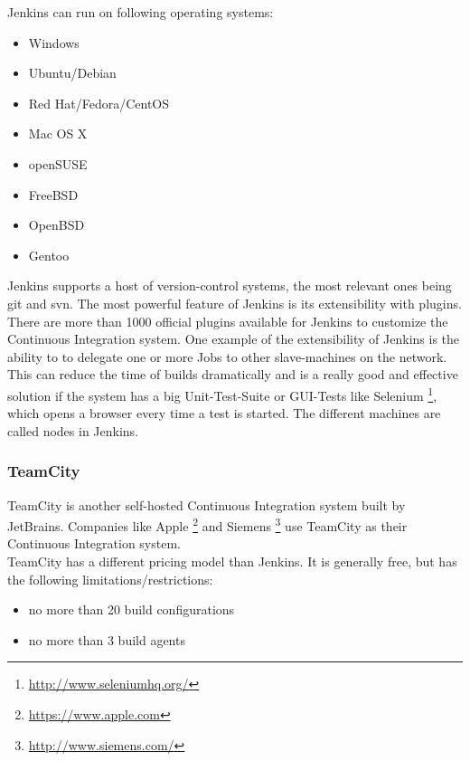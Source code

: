Jenkins can run on following operating systems: 

\begin{itemize} 
        \item Windows
        \item Ubuntu/Debian
        \item Red Hat/Fedora/CentOS
        \item Mac OS X
        \item openSUSE
        \item FreeBSD
        \item OpenBSD
        \item Gentoo
\end{itemize}

Jenkins supports a host of version-control systems, the most relevant ones being
git and svn. The most powerful feature of Jenkins is its extensibility with
plugins.\\

There are more than 1000 official plugins available for Jenkins to customize the
Continuous Integration system. One example of the extensibility of Jenkins is
the ability to to delegate one or more Jobs to other slave-machines on the
network. This can reduce the time of builds dramatically and is a really good
and effective solution if the system has a big Unit-Test-Suite or GUI-Tests like
Selenium \footnote{\url{http://www.seleniumhq.org/}}, which opens a browser
every time a test is started. The different machines are called nodes in
Jenkins.

\subsubsection{TeamCity}

TeamCity is another self-hosted Continuous Integration system built by
JetBrains. Companies like Apple \footnote{\url{https://www.apple.com}} and
Siemens \footnote{\url{http://www.siemens.com/}} use TeamCity as their
Continuous Integration system.\\

TeamCity has a different pricing model than Jenkins. It is generally free, but
has the following limitations/restrictions:

\begin{itemize} 
        \item no more than 20 build configurations
        \item no more than 3 build agents
\end{itemize}

